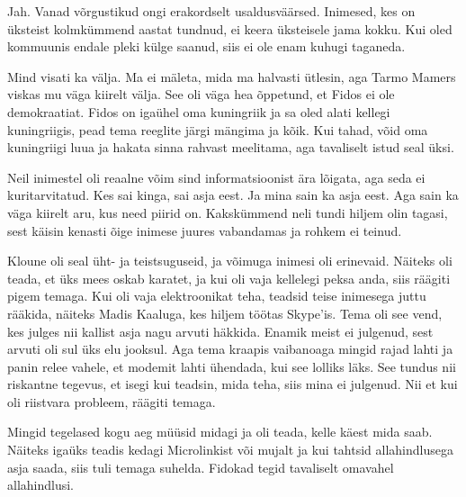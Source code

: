 Jah. Vanad võrgustikud ongi erakordselt usaldusväärsed. Inimesed, kes on üksteist
kolmkümmend aastat tundnud, ei keera üksteisele jama kokku. Kui oled
kommuunis endale pleki külge saanud, siis ei ole enam kuhugi taganeda. 


Mind visati ka välja. Ma ei mäleta, mida ma halvasti ütlesin, aga Tarmo 
Mamers viskas mu väga kiirelt välja. See oli väga 
hea õppetund, et Fidos ei ole demokraatiat. Fidos on igaühel oma kuningriik ja 
sa oled alati kellegi kuningriigis, pead tema reeglite järgi mängima ja 
kõik. Kui tahad, võid oma kuningriigi luua ja hakata sinna rahvast 
meelitama, aga tavaliselt istud seal üksi. 


Neil inimestel oli reaalne võim sind informatsioonist ära lõigata, aga seda 
ei kuritarvitatud. Kes sai kinga, sai asja eest. Ja mina 
sain ka asja eest. Aga sain ka väga kiirelt aru, kus need 
piirid on. Kakskümmend neli tundi hiljem olin tagasi, sest käisin kenasti 
õige inimese juures vabandamas ja rohkem ei teinud. 

Kloune oli seal üht- ja teistsuguseid, ja võimuga inimesi oli erinevaid. Näiteks 
oli teada, et üks mees oskab karatet, ja kui oli vaja kellelegi peksa anda, siis 
räägiti pigem temaga. Kui oli vaja elektroonikat teha, 
teadsid teise inimesega juttu rääkida, näiteks Madis Kaaluga, kes hiljem töötas Skype'is. Tema oli see vend, kes julges nii 
kallist asja nagu arvuti häkkida. Enamik meist ei julgenud, sest arvuti oli 
sul üks elu jooksul. Aga tema kraapis vaibanoaga mingid rajad lahti ja 
panin relee vahele, et modemit lahti ühendada, kui see lolliks läks. See tundus 
nii riskantne tegevus, et isegi kui teadsin, mida teha, siis mina ei julgenud. Nii et
kui oli riistvara probleem, räägiti temaga. 

Mingid tegelased kogu aeg müüsid midagi ja oli teada, kelle käest 
mida saab. Näiteks igaüks teadis kedagi Microlinkist või mujalt ja kui tahtsid allahindlusega asja 
saada, siis tuli temaga suhelda. Fidokad tegid tavaliselt omavahel 
allahindlusi. 


